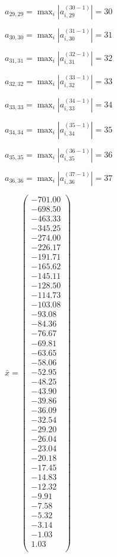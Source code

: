 \documentclass[a4paper,12pt]{article}
\begin{document}
$a _{ 29, 29 } =  \max _i |a _{ i, 29 } ^{ (30 - 1) } | = 30$

$a _{ 30, 30 } =  \max _i |a _{ i, 30 } ^{ (31 - 1) } | = 31$

$a _{ 31, 31 } =  \max _i |a _{ i, 31 } ^{ (32 - 1) } | = 32$

$a _{ 32, 32 } =  \max _i |a _{ i, 32 } ^{ (33 - 1) } | = 33$

$a _{ 33, 33 } =  \max _i |a _{ i, 33 } ^{ (34 - 1) } | = 34$

$a _{ 34, 34 } =  \max _i |a _{ i, 34 } ^{ (35 - 1) } | = 35$

$a _{ 35, 35 } =  \max _i |a _{ i, 35 } ^{ (36 - 1) } | = 36$

$a _{ 36, 36 } =  \max _i |a _{ i, 36 } ^{ (37 - 1) } | = 37$

$\bar { x } = \begin{pmatrix}
-701.00 \\
-698.50 \\
-463.33 \\
-345.25 \\
-274.00 \\
-226.17 \\
-191.71 \\
-165.62 \\
-145.11 \\
-128.50 \\
-114.73 \\
-103.08 \\
-93.08 \\
-84.36 \\
-76.67 \\
-69.81 \\
-63.65 \\
-58.06 \\
-52.95 \\
-48.25 \\
-43.90 \\
-39.86 \\
-36.09 \\
-32.54 \\
-29.20 \\
-26.04 \\
-23.04 \\
-20.18 \\
-17.45 \\
-14.83 \\
-12.32 \\
-9.91 \\
-7.58 \\
-5.32 \\
-3.14 \\
-1.03 \\
1.03 \\
\end{pmatrix}
$
\end{document}
